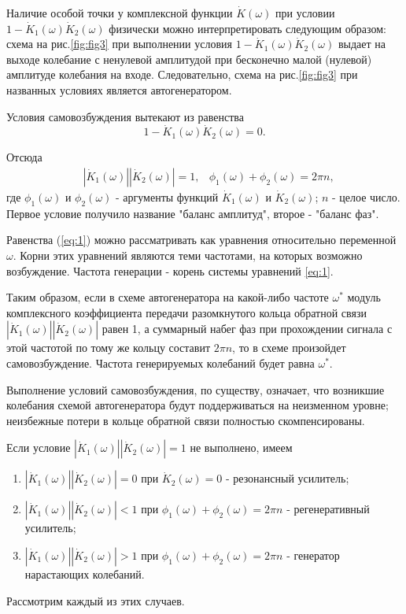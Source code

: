 Наличие особой точки у комплексной функции $\dot{K}(\omega)$ при условии $1-\dot{K}_1(\omega)\dot{K}_2(\omega)$ физически можно интерпретировать следующим образом: схема на рис.\ref{fig:fig3} при выполнении условия $1-\dot{K}_1(\omega)\dot{K}_2(\omega)$ выдает на выходе колебание с ненулевой амплитудой при бесконечно малой (нулевой) амплитуде колебания на входе. Следовательно, схема  на рис.\ref{fig:fig3} при названных условиях является автогенератором.

Условия самовозбуждения вытекают из равенства
\begin{equation*}
1-\dot{K}_1(\omega)\dot{K}_2(\omega)=0.
\end{equation*}

Отсюда 
\begin{equation}
\begin{aligned}
& |\dot{K}_1(\omega)||\dot{K}_2(\omega)|=1, & \phi_1(\omega)+\phi_2(\omega)=2\pi n,
\end{aligned}
\label{eq:1}
\end{equation}
где $\phi_1(\omega)$ и $\phi_2(\omega)$ - аргументы функций $\dot{K}_1(\omega)$ и $\dot{K}_2(\omega)$; $n$ - целое число. Первое условие получило название "баланс амплитуд", второе - "баланс фаз".

Равенства (\ref{eq:1}) можно рассматривать как уравнения относительно переменной $\omega$. Корни этих уравнений являются теми частотами, на которых возможно возбуждение. Частота генерации - корень системы уравнений \eqref{eq:1}.

Таким образом, если в схеме автогенератора на какой-либо частоте $\omega^*$ модуль комплексного коэффициента передачи разомкнутого кольца обратной связи $|\dot{K}_1(\omega)||\dot{K}_2(\omega)|$ равен 1, а суммарный набег фаз при прохождении сигнала с этой частотой по тому же кольцу составит $2\pi n$, то в схеме произойдет самовозбуждение. Частота генерируемых колебаний будет равна $\omega^*$.

Выполнение условий самовозбуждения, по существу, означает, что возникшие колебания схемой автогенератора будут поддерживаться на неизменном уровне; неизбежные потери в кольце обратной связи полностью скомпенсированы.

Если условие $|\dot{K}_1(\omega)||\dot{K}_2(\omega)|=1$ не выполнено, имеем
\begin{enumerate}
\item {
	$|\dot{K}_1(\omega)||\dot{K}_2(\omega)|=0$ при $\dot{K}_2(\omega)=0$ - резонансный усилитель;
}
\item {
	$|\dot{K}_1(\omega)||\dot{K}_2(\omega)|<1$ при $\phi_1(\omega)+\phi_2(\omega)=2\pi n$ - регенеративный усилитель;
}
\item {
	$|\dot{K}_1(\omega)||\dot{K}_2(\omega)|>1$ при $\phi_1(\omega)+\phi_2(\omega)=2\pi n$ - генератор нарастающих колебаний.
}
\end{enumerate}
Рассмотрим каждый из этих случаев.


